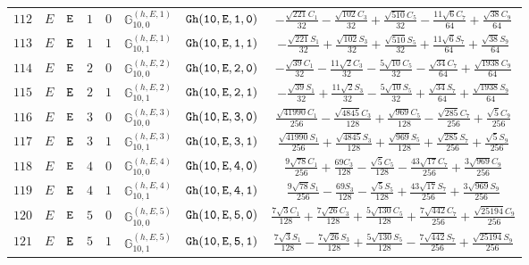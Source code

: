 \documentclass[fleqn,8pt]{jsarticle}
\begin{document}
\begin{table}[ht!]
\begin{center}
\begin{tabular}{cccccccc}
$ 112 $ & $ E $ & $ {\tt E} $ & $ 1 $ & $ 0 $ & $ \mathbb{G}_{10,0}^{(h,E,1)} $ & $ {\tt Gh(10,E,1,0)} $ & $ - \frac{\sqrt{221} C_{1}}{32} - \frac{\sqrt{102} C_{3}}{32} + \frac{\sqrt{510} C_{5}}{32} - \frac{11 \sqrt{6} C_{7}}{64} + \frac{\sqrt{38} C_{9}}{64} $ \\
$ 113 $ & $ E $ & $ {\tt E} $ & $ 1 $ & $ 1 $ & $ \mathbb{G}_{10,1}^{(h,E,1)} $ & $ {\tt Gh(10,E,1,1)} $ & $ - \frac{\sqrt{221} S_{1}}{32} + \frac{\sqrt{102} S_{3}}{32} + \frac{\sqrt{510} S_{5}}{32} + \frac{11 \sqrt{6} S_{7}}{64} + \frac{\sqrt{38} S_{9}}{64} $ \\
$ 114 $ & $ E $ & $ {\tt E} $ & $ 2 $ & $ 0 $ & $ \mathbb{G}_{10,0}^{(h,E,2)} $ & $ {\tt Gh(10,E,2,0)} $ & $ - \frac{\sqrt{39} C_{1}}{32} - \frac{11 \sqrt{2} C_{3}}{32} - \frac{5 \sqrt{10} C_{5}}{32} - \frac{\sqrt{34} C_{7}}{64} + \frac{\sqrt{1938} C_{9}}{64} $ \\
$ 115 $ & $ E $ & $ {\tt E} $ & $ 2 $ & $ 1 $ & $ \mathbb{G}_{10,1}^{(h,E,2)} $ & $ {\tt Gh(10,E,2,1)} $ & $ - \frac{\sqrt{39} S_{1}}{32} + \frac{11 \sqrt{2} S_{3}}{32} - \frac{5 \sqrt{10} S_{5}}{32} + \frac{\sqrt{34} S_{7}}{64} + \frac{\sqrt{1938} S_{9}}{64} $ \\
$ 116 $ & $ E $ & $ {\tt E} $ & $ 3 $ & $ 0 $ & $ \mathbb{G}_{10,0}^{(h,E,3)} $ & $ {\tt Gh(10,E,3,0)} $ & $ \frac{\sqrt{41990} C_{1}}{256} - \frac{\sqrt{4845} C_{3}}{128} + \frac{\sqrt{969} C_{5}}{128} - \frac{\sqrt{285} C_{7}}{256} + \frac{\sqrt{5} C_{9}}{256} $ \\
$ 117 $ & $ E $ & $ {\tt E} $ & $ 3 $ & $ 1 $ & $ \mathbb{G}_{10,1}^{(h,E,3)} $ & $ {\tt Gh(10,E,3,1)} $ & $ \frac{\sqrt{41990} S_{1}}{256} + \frac{\sqrt{4845} S_{3}}{128} + \frac{\sqrt{969} S_{5}}{128} + \frac{\sqrt{285} S_{7}}{256} + \frac{\sqrt{5} S_{9}}{256} $ \\
$ 118 $ & $ E $ & $ {\tt E} $ & $ 4 $ & $ 0 $ & $ \mathbb{G}_{10,0}^{(h,E,4)} $ & $ {\tt Gh(10,E,4,0)} $ & $ \frac{9 \sqrt{78} C_{1}}{256} + \frac{69 C_{3}}{128} - \frac{\sqrt{5} C_{5}}{128} - \frac{43 \sqrt{17} C_{7}}{256} + \frac{3 \sqrt{969} C_{9}}{256} $ \\
$ 119 $ & $ E $ & $ {\tt E} $ & $ 4 $ & $ 1 $ & $ \mathbb{G}_{10,1}^{(h,E,4)} $ & $ {\tt Gh(10,E,4,1)} $ & $ \frac{9 \sqrt{78} S_{1}}{256} - \frac{69 S_{3}}{128} - \frac{\sqrt{5} S_{5}}{128} + \frac{43 \sqrt{17} S_{7}}{256} + \frac{3 \sqrt{969} S_{9}}{256} $ \\
$ 120 $ & $ E $ & $ {\tt E} $ & $ 5 $ & $ 0 $ & $ \mathbb{G}_{10,0}^{(h,E,5)} $ & $ {\tt Gh(10,E,5,0)} $ & $ \frac{7 \sqrt{3} C_{1}}{128} + \frac{7 \sqrt{26} C_{3}}{128} + \frac{5 \sqrt{130} C_{5}}{128} + \frac{7 \sqrt{442} C_{7}}{256} + \frac{\sqrt{25194} C_{9}}{256} $ \\
$ 121 $ & $ E $ & $ {\tt E} $ & $ 5 $ & $ 1 $ & $ \mathbb{G}_{10,1}^{(h,E,5)} $ & $ {\tt Gh(10,E,5,1)} $ & $ \frac{7 \sqrt{3} S_{1}}{128} - \frac{7 \sqrt{26} S_{3}}{128} + \frac{5 \sqrt{130} S_{5}}{128} - \frac{7 \sqrt{442} S_{7}}{256} + \frac{\sqrt{25194} S_{9}}{256} $ \\
 \hline \hline
\end{tabular}
\end{center}
\end{table}
\end{document}
